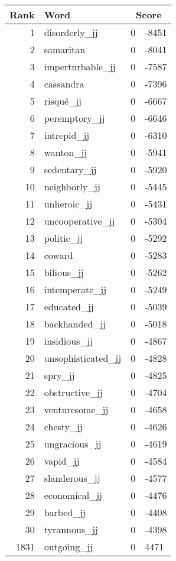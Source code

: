 \begin{longtable}[!htbp]{| rlr@{.}l |}
    \hline
    \textbf{Rank} & \textbf{Word} & \multicolumn{2}{c|}{\textbf{Score}} \\
    \hline
    \endhead
    1 & disorderly\_jj & 0 & -8451 \\
    2 & samaritan & 0 & -8041 \\
    3 & imperturbable\_jj & 0 & -7587 \\
    4 & cassandra & 0 & -7396 \\
    5 & risqué\_jj & 0 & -6667 \\
    6 & peremptory\_jj & 0 & -6646 \\
    7 & intrepid\_jj & 0 & -6310 \\
    8 & wanton\_jj & 0 & -5941 \\
    9 & sedentary\_jj & 0 & -5920 \\
    10 & neighborly\_jj & 0 & -5445 \\
    11 & unheroic\_jj & 0 & -5431 \\
    12 & uncooperative\_jj & 0 & -5304 \\
    13 & politic\_jj & 0 & -5292 \\
    14 & coward & 0 & -5283 \\
    15 & bilious\_jj & 0 & -5262 \\
    16 & intemperate\_jj & 0 & -5249 \\
    17 & educated\_jj & 0 & -5039 \\
    18 & backhanded\_jj & 0 & -5018 \\
    19 & insidious\_jj & 0 & -4867 \\
    20 & unsophisticated\_jj & 0 & -4828 \\
    21 & spry\_jj & 0 & -4825 \\
    22 & obstructive\_jj & 0 & -4704 \\
    23 & venturesome\_jj & 0 & -4658 \\
    24 & chesty\_jj & 0 & -4626 \\
    25 & ungracious\_jj & 0 & -4619 \\
    26 & vapid\_jj & 0 & -4584 \\
    27 & slanderous\_jj & 0 & -4577 \\
    28 & economical\_jj & 0 & -4476 \\
    29 & barbed\_jj & 0 & -4408 \\
    30 & tyrannous\_jj & 0 & -4398 \\
    1831 & outgoing\_jj & 0 & 4471 \\

\end{longtable}
